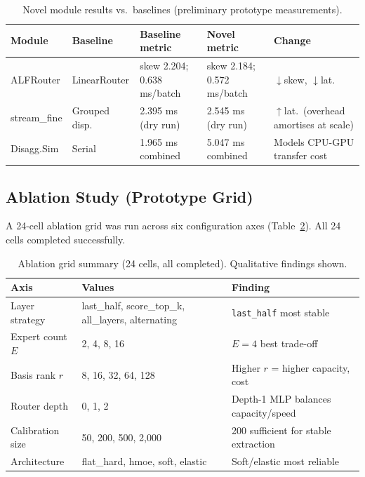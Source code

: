 \documentclass[12pt,a4paper]{article}
\begin{document}
\begin{table}[H]
\centering
\caption{Novel module results vs.\ baselines (preliminary prototype measurements).}
\label{tab:novel}
\begin{tabular}{lllll}
\toprule
\textbf{Module} & \textbf{Baseline} & \textbf{Baseline metric} & \textbf{Novel metric} & \textbf{Change} \\
\midrule
ALFRouter     & LinearRouter  & skew 2.204; 0.638 ms/batch & skew 2.184; 0.572 ms/batch & $\downarrow$skew, $\downarrow$lat.\ \\
stream\_fine  & Grouped disp. & 2.395 ms (dry run)         & 2.545 ms (dry run)         & $\uparrow$lat.\ (overhead amortises at scale) \\
Disagg.Sim    & Serial        & 1.965 ms combined          & 5.047 ms combined          & Models CPU-GPU transfer cost \\
\bottomrule
\end{tabular}
\end{table}

\subsection{Ablation Study (Prototype Grid)}

A 24-cell ablation grid was run across six configuration axes (Table~\ref{tab:ablation}). All 24 cells completed successfully.

\begin{table}[H]
\centering
\caption{Ablation grid summary (24 cells, all completed). Qualitative findings shown.}
\label{tab:ablation}
\begin{tabular}{lll}
\toprule
\textbf{Axis} & \textbf{Values} & \textbf{Finding} \\
\midrule
Layer strategy   & last\_half, score\_top\_k, all\_layers, alternating & \texttt{last\_half} most stable \\
Expert count $E$ & 2, 4, 8, 16                                         & $E{=}4$ best trade-off \\
Basis rank $r$   & 8, 16, 32, 64, 128                                  & Higher $r$ = higher capacity, cost \\
Router depth     & 0, 1, 2                                             & Depth-1 MLP balances capacity/speed \\
Calibration size & 50, 200, 500, 2,000                                 & 200 sufficient for stable extraction \\
Architecture     & flat\_hard, hmoe, soft, elastic                     & Soft/elastic most reliable \\
\bottomrule
\end{tabular}
\end{table}
\end{document}
